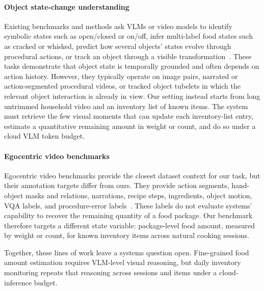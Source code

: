\documentclass[sigconf,anonymous,nonacm]{acmart}
\begin{document}
\paragraph{Object state-change understanding}
 Existing benchmarks and methods ask VLMs or video models
to identify symbolic states such as open/closed or on/off, infer
multi-label food states such as cracked or whisked, predict how several
objects' states evolve through procedural actions, or track an object
through a visible transformation~\cite{ukai2025status,
tateno2025learning,zameni2025moscato,sunTrackingUnderstandingObject2025}.
These tasks demonstrate that object state is temporally grounded and
often depends on action history. However, they typically operate on
image pairs, narrated or action-segmented procedural videos, or tracked
object tubelets in which the relevant object interaction is already in
view. Our setting instead starts from long untrimmed household video and
an inventory list of known items. The system must retrieve the few
visual moments that can update each inventory-list entry, estimate a
quantitative remaining amount in weight or count, and do so under a
cloud VLM token budget.

\paragraph{Egocentric video benchmarks}
Egocentric video benchmarks provide the closest dataset context for our
task, but their annotation targets differ from ours. They
provide action segments, hand-object masks and relations, narrations,
recipe steps, ingredients, object motion, VQA labels, and
procedure-error labels~\cite{damenRescalingEgocentricVision2022,
darkhalilEPICKITCHENSVISORBenchmark2022,grauman2022ego4d,
perrettHDEPICHighlyDetailedEgocentric2025,
peddiCaptainCook4DDatasetUnderstanding2024,plizzari2024outlook,grauman2024ego,wang2023holoassist,jia2022egotaskqa,huh2025epic,zhu2023egoobjects,huang2024egoexolearn,chen2026egoplan}. These labels do not evaluate systems' capability to
recover the remaining quantity of a food package. Our benchmark therefore targets a different state
variable: package-level food amount, measured by weight or count, for
known inventory items across natural cooking sessions.

Together, these lines of work leave a systems question open. Fine-grained
food amount estimation requires VLM-level visual reasoning, but daily
inventory monitoring repeats that reasoning across sessions and items
under a cloud-inference budget.
\end{document}
